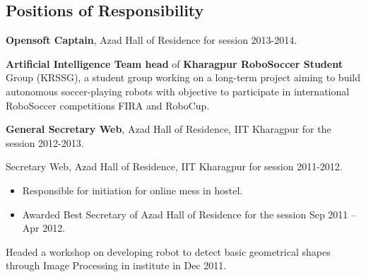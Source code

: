\documentclass[hidelinks,margin,line,10pt,a4paper]{resume}
\begin{document}
\begin{resume}
\section{\mysidestyle Positions of Responsibility} 
\begin{list2}
\item	\textbf{Opensoft Captain}, Azad Hall of Residence for session 2013-2014.\vspace{1mm}%
\item \textbf{Artificial Intelligence Team head} of \textbf{Kharagpur RoboSoccer Student} Group (KRSSG), a student group working on a long-term project aiming to build autonomous soccer-playing robots with objective to participate in international RoboSoccer competitions FIRA and RoboCup.\vspace{1mm}%
\item 	 \textbf{General Secretary Web}, Azad Hall of Residence, IIT Kharagpur for the session 2012-2013.\vspace{1mm}%
\item 	Secretary Web, Azad Hall of Residence, IIT Kharagpur for session 2011-2012.\vspace{1mm}%
\begin{itemize}\vspace{-0.5em}
\renewcommand\labelitemi{--}
\item Responsible for initiation for online mess in hostel. \vspace{-0.5em}
\item Awarded Best Secretary of Azad Hall of Residence for the session Sep 2011 – Apr 2012.
\end{itemize}
\item Headed a workshop on developing robot to detect basic geometrical shapes through Image Processing in institute in Dec 2011.
\end{list2}


\end{resume}
\end{document}
